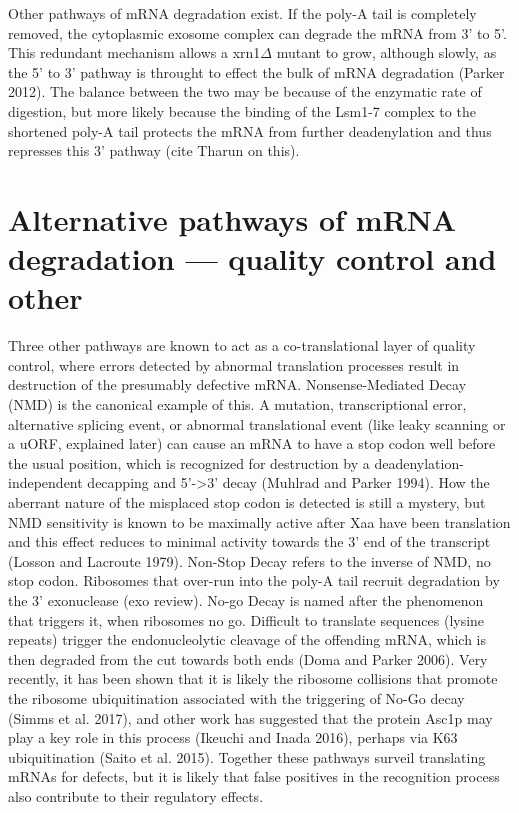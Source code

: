Other pathways
of mRNA degradation exist. If the poly-A tail is completely removed,
the cytoplasmic exosome complex can degrade the mRNA from 3’ to 5’.
This redundant mechanism allows a xrn1$\Delta$ mutant to grow, although
slowly, as the 5’ to 3’ pathway is throught to effect the bulk of mRNA
degradation (Parker 2012). The balance between the two may be because
of the enzymatic rate of digestion, but more likely because the
binding of the Lsm1-7 complex to the shortened poly-A tail protects
the mRNA from further deadenylation and thus represses this 3’ pathway
(cite Tharun on this).  

\section{Alternative pathways of mRNA degradation ---
quality control and other }

Three other pathways are known to act as a
co-translational layer of quality control, where errors detected by
abnormal translation processes result in destruction of the presumably
defective mRNA. Nonsense-Mediated Decay (NMD) is the canonical example
of this. A mutation, transcriptional error, alternative splicing
event, or abnormal translational event (like leaky scanning or a uORF,
explained later) can cause an mRNA to have a stop codon well before
the usual position, which is recognized for destruction by a
deadenylation-independent decapping and 5’->3’ decay (Muhlrad and
Parker 1994). How the aberrant nature of the misplaced stop codon is
detected is still a mystery, but NMD sensitivity is known to be
maximally active after Xaa have been translation and this effect
reduces to minimal activity towards the 3’ end of the transcript
(Losson and Lacroute 1979). Non-Stop Decay refers to the inverse of
NMD, no stop codon. Ribosomes that over-run into the poly-A tail
recruit degradation by the 3’ exonuclease (exo review). No-go Decay is
named after the phenomenon that triggers it, when ribosomes no go.
Difficult to translate sequences (lysine repeats) trigger the
endonucleolytic cleavage of the offending mRNA, which is then degraded
from the cut towards both ends (Doma and Parker 2006). Very recently,
it has been shown that it is likely the ribosome collisions that
promote the ribosome ubiquitination associated with the triggering of
No-Go decay (Simms et al. 2017), and other work has suggested that the
protein Asc1p may play a key role in this process (Ikeuchi and Inada
2016), perhaps via K63 ubiquitination (Saito et al. 2015). Together
these pathways surveil translating mRNAs for defects, but it is likely
that false positives in the recognition process also contribute to
their regulatory effects.  

